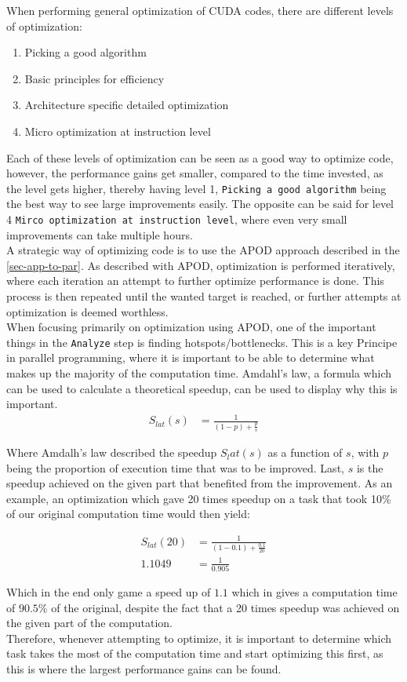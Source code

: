 When performing general optimization of CUDA codes, there are different levels of optimization:
\begin{enumerate}
	\item Picking a good algorithm
	\item Basic principles for efficiency
	\item Architecture specific detailed optimization
	\item Micro optimization at instruction level
\end{enumerate}

Each of these levels of optimization can be seen as a good way to optimize code, however, the performance gains get smaller, compared to the time invested, as the level gets higher, thereby having level 1, \texttt{Picking a good algorithm} being the best way to see large improvements easily. The opposite can be said for level 4 \texttt{Mirco optimization at instruction level}, where even very small improvements can take multiple hours.\\

A strategic way of optimizing code is to use the APOD approach described in the \cref{sec-app-to-par}. As described with APOD, optimization is performed iteratively, where each iteration an attempt to further optimize performance is done. This process is then repeated until the wanted target is reached, or further attempts at optimization is deemed worthless.\\
When focusing primarily on optimization using APOD, one of the important things in the \texttt{Analyze} step is finding hotspots/bottlenecks. This is a key Principe in parallel programming, where it is important to be able to determine what makes up the majority of the computation time. Amdahl's law, a formula which can be used to calculate a theoretical speedup, can be used to display why this is important.\\
\begin{align*}
	S_{lat}(s) &= \frac{1}{(1-p)+\frac{p}{s}}
\end{align*}

Where Amdalh's law described the speedup $S_lat(s)$ as a function of $s$, with $p$ being the proportion of execution time that was to be improved. Last, $s$ is the speedup achieved on the given part that benefited from the improvement. As an example, an optimization which gave 20 times speedup on a task that took 10\% of our original computation time would then yield:

 \begin{align*}
 S_{lat}(20) &= \frac{1}{(1-0.1)+\frac{0.1}{20}}\\
 1.1049 &= \frac{1}{0.905}
 \end{align*}
 
 Which in the end only game a speed up of $1.1$ which in gives a computation time of $90.5\%$ of the original, despite the fact that a 20 times speedup was achieved on the given part of the computation.\\
Therefore, whenever attempting to optimize, it is important to determine which task takes the most of the computation time and start optimizing this first, as this is where the largest performance gains can be found. 